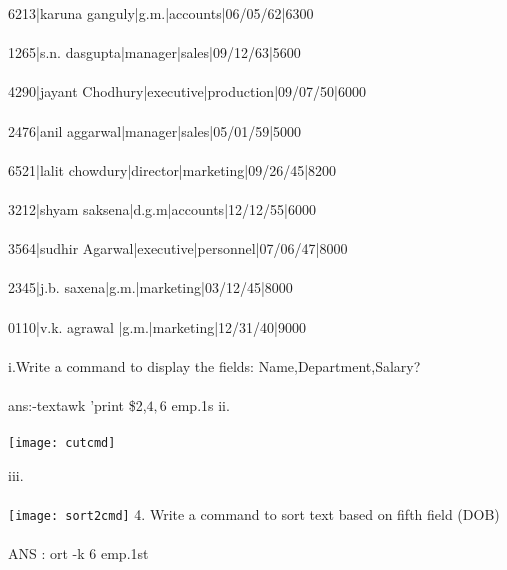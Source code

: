 \documentclass{article}
\begin{document}
6213|karuna ganguly|g.m.|accounts|06/05/62|6300\\ \\
1265|s.n. dasgupta|manager|sales|09/12/63|5600\\ \\
4290|jayant Chodhury|executive|production|09/07/50|6000\\ \\
2476|anil aggarwal|manager|sales|05/01/59|5000\\ \\
6521|lalit chowdury|director|marketing|09/26/45|8200\\ \\
3212|shyam saksena|d.g.m|accounts|12/12/55|6000\\ \\
3564|sudhir Agarwal|executive|personnel|07/06/47|8000\\ \\
2345|j.b. saxena|g.m.|marketing|03/12/45|8000\\ \\
0110|v.k. agrawal |g.m.|marketing|12/31/40|9000\\ \\
i.Write a command to display the fields:
Name,Department,Salary? \\ \\
ans:-text{awk '{print \$2,$4,$6} emp.1s}
ii.\\\\

\texttt{[image: cutcmd]}

iii. \\ \\

\texttt{[image: sort2cmd]}
4. Write a command to sort text based on fifth field (DOB)\\ \\
ANS : ort -k 6 emp.1st
\end{document}
